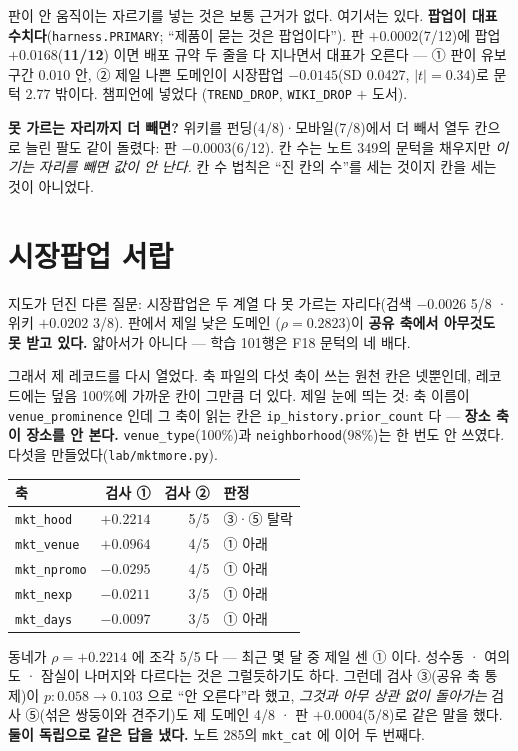 \documentclass[11pt]{article}
\begin{document}
판이 안 움직이는 자르기를 넣는 것은 보통 근거가 없다. 여기서는 있다.
\textbf{팝업이 대표 수치다}(\texttt{harness.PRIMARY}; ``제품이 묻는
것은 팝업이다''). 판 $+0.0002$(7/12)에 팝업 $+0.0168$(\textbf{11/12}) 이면
배포 규약 두 줄을 다 지나면서 대표가 오른다 --- ① 판이 유보 구간
$0.010$ 안, ② 제일 나쁜 도메인이 시장팝업 $-0.0145$(SD 0.0427,
$|t|=0.34$)로 문턱 $2.77$ 밖이다. 챔피언에 넣었다
(\texttt{TREND\_DROP}, \texttt{WIKI\_DROP} $+$ 도서).

\textbf{못 가르는 자리까지 더 빼면?} 위키를 펀딩(4/8)·모바일(7/8)에서
더 빼서 열두 칸으로 늘린 팔도 같이 돌렸다: 판 $-0.0003$(6/12). 칸 수는
노트 349의 문턱을 채우지만 \emph{이기는 자리를 빼면 값이 안 난다.}
칸 수 법칙은 ``진 칸의 수''를 세는 것이지 칸을 세는 것이 아니었다.

\section{시장팝업 서랍}

지도가 던진 다른 질문: 시장팝업은 두 계열 다 못 가르는 자리다(검색
$-0.0026$ 5/8 · 위키 $+0.0202$ 3/8). 판에서 제일 낮은 도메인
($\rho=0.2823$)이 \textbf{공유 축에서 아무것도 못 받고 있다.} 얇아서가
아니다 --- 학습 101행은 F18 문턱의 네 배다.

그래서 제 레코드를 다시 열었다. 축 파일의 다섯 축이 쓰는 원천 칸은
넷뿐인데, 레코드에는 덮음 100\%에 가까운 칸이 그만큼 더 있다. 제일
눈에 띄는 것: 축 이름이 \texttt{venue\_prominence} 인데 그 축이 읽는
칸은 \texttt{ip\_history.prior\_count} 다 --- \textbf{장소 축이 장소를
안 본다.} \texttt{venue\_type}(100\%)과 \texttt{neighborhood}(98\%)는
한 번도 안 쓰였다. 다섯을 만들었다(\texttt{lab/mktmore.py}).

\begin{center}
\begin{tabular}{lrrl}
\hline
축 & 검사 ① & 검사 ② & 판정 \\
\hline
\texttt{mkt\_hood}   & $+0.2214$ & 5/5 & ③·⑤ 탈락 \\
\texttt{mkt\_venue}  & $+0.0964$ & 4/5 & ① 아래 \\
\texttt{mkt\_npromo} & $-0.0295$ & 4/5 & ① 아래 \\
\texttt{mkt\_nexp}   & $-0.0211$ & 3/5 & ① 아래 \\
\texttt{mkt\_days}   & $-0.0097$ & 3/5 & ① 아래 \\
\hline
\end{tabular}
\end{center}

동네가 $\rho=+0.2214$ 에 조각 5/5 다 --- 최근 몇 달 중 제일 센 ① 이다.
성수동 · 여의도 · 잠실이 나머지와 다르다는 것은 그럴듯하기도 하다.
그런데 검사 ③(공유 축 통제)이 $p:0.058\to0.103$ 으로 ``안 오른다''라
했고, \emph{그것과 아무 상관 없이 돌아가는} 검사 ⑤(섞은 쌍둥이와
견주기)도 제 도메인 4/8 · 판 $+0.0004$(5/8)로 같은 말을 했다.
\textbf{둘이 독립으로 같은 답을 냈다.} 노트 285의
\texttt{mkt\_cat} 에 이어 두 번째다.
\end{document}
